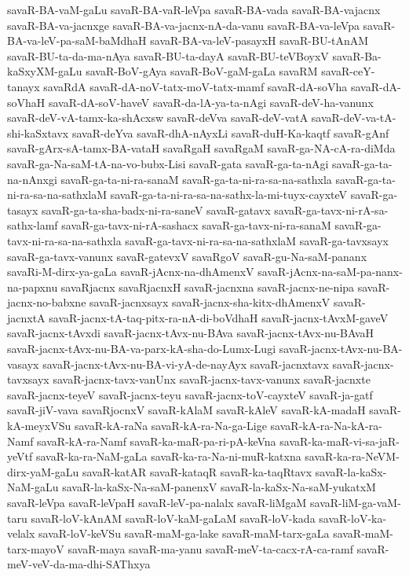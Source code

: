 {savaR-BA-vaM-gaLu
savaR-BA-vaR-leVpa
savaR-BA-vada
savaR-BA-vajacnx
savaR-BA-va-jacnxge
savaR-BA-va-jacnx-nA-da-vanu
savaR-BA-va-leVpa
savaR-BA-va-leV-pa-saM-baMdhaH
savaR-BA-va-leV-pasayxH
savaR-BU-tAnAM
savaR-BU-ta-da-ma-nAya
savaR-BU-ta-dayA
savaR-BU-teVBoyxV
savaR-Ba-kaSxyXM-gaLu
savaR-BoV-gAya
savaR-BoV-gaM-gaLa
savaRM
savaR-ceY-tanayx
savaRdA
savaR-dA-noV-tatx-moV-tatx-mamf
savaR-dA-soVha
savaR-dA-soVhaH
savaR-dA-soV-haveV
savaR-da-lA-ya-ta-nAgi
savaR-deV-ha-vanunx
savaR-deV-vA-tamx-ka-shAcxsw
savaR-deVva
savaR-deV-vatA
savaR-deV-va-tA-shi-kaSxtavx
savaR-deYva
savaR-dhA-nAyxLi
savaR-duH-Ka-kaqtf
savaR-gAnf
savaR-gArx-sA-tamx-BA-vataH
savaRgaH
savaRgaM
savaR-ga-NA-cA-ra-diMda
savaR-ga-Na-saM-tA-na-vo-bubx-Lisi
savaR-gata
savaR-ga-ta-nAgi
savaR-ga-ta-na-nAnxgi
savaR-ga-ta-ni-ra-sanaM
savaR-ga-ta-ni-ra-sa-na-sathxla
savaR-ga-ta-ni-ra-sa-na-sathxlaM
savaR-ga-ta-ni-ra-sa-na-sathx-la-mi-tuyx-cayxteV
savaR-ga-tasayx
savaR-ga-ta-sha-badx-ni-ra-saneV
savaR-gatavx
savaR-ga-tavx-ni-rA-sa-sathx-lamf
savaR-ga-tavx-ni-rA-sashacx
savaR-ga-tavx-ni-ra-sanaM
savaR-ga-tavx-ni-ra-sa-na-sathxla
savaR-ga-tavx-ni-ra-sa-na-sathxlaM
savaR-ga-tavxsayx
savaR-ga-tavx-vanunx
savaR-gatevxV
savaRgoV
savaR-gu-Na-saM-pananx
savaRi-M-dirx-ya-gaLa
savaR-jAcnx-na-dhAmenxV
savaR-jAcnx-na-saM-pa-nanx-na-papxnu
savaRjacnx
savaRjacnxH
savaR-jacnxna
savaR-jacnx-ne-nipa
savaR-jacnx-no-babxne
savaR-jacnxsayx
savaR-jacnx-sha-kitx-dhAmenxV
savaR-jacnxtA
savaR-jacnx-tA-taq-pitx-ra-nA-di-boVdhaH
savaR-jacnx-tAvxM-gaveV
savaR-jacnx-tAvxdi
savaR-jacnx-tAvx-nu-BAva
savaR-jacnx-tAvx-nu-BAvaH
savaR-jacnx-tAvx-nu-BA-va-parx-kA-sha-do-Lumx-Lugi
savaR-jacnx-tAvx-nu-BA-vasayx
savaR-jacnx-tAvx-nu-BA-vi-yA-de-nayAyx
savaR-jacnxtavx
savaR-jacnx-tavxsayx
savaR-jacnx-tavx-vanUnx
savaR-jacnx-tavx-vanunx
savaR-jacnxte
savaR-jacnx-teyeV
savaR-jacnx-teyu
savaR-jacnx-toV-cayxteV
savaR-ja-gatf
savaR-jiV-vava
savaRjocnxV
savaR-kAlaM
savaR-kAleV
savaR-kA-madaH
savaR-kA-meyxVSu
savaR-kA-raNa
savaR-kA-ra-Na-ga-Lige
savaR-kA-ra-Na-kA-ra-Namf
savaR-kA-ra-Namf
savaR-ka-maR-pa-ri-pA-keVna
savaR-ka-maR-vi-sa-jaR-yeVtf
savaR-ka-ra-NaM-gaLa
savaR-ka-ra-Na-ni-muR-katxna
savaR-ka-ra-NeVM-dirx-yaM-gaLu
savaR-katAR
savaR-kataqR
savaR-ka-taqRtavx
savaR-la-kaSx-NaM-gaLu
savaR-la-kaSx-Na-saM-panenxV
savaR-la-kaSx-Na-saM-yukatxM
savaR-leVpa
savaR-leVpaH
savaR-leV-pa-nalalx
savaR-liMgaM
savaR-liM-ga-vaM-taru
savaR-loV-kAnAM
savaR-loV-kaM-gaLaM
savaR-loV-kada
savaR-loV-ka-velalx
savaR-loV-keVSu
savaR-maM-ga-lake
savaR-maM-tarx-gaLa
savaR-maM-tarx-mayoV
savaR-maya
savaR-ma-yanu
savaR-meV-ta-cacx-rA-ca-ramf
savaR-meV-veV-da-ma-dhi-SAThxya
}
